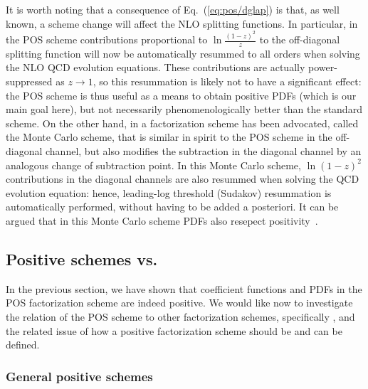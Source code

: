 It is worth noting that a consequence of Eq.~(\ref{eq:pos/dglap}) is that,
as well known, a scheme change will affect the NLO splitting
functions. In particular, in the POS scheme contributions proportional
to $\ln\frac{(1-z)^2}{z}$ to the off-diagonal splitting function will
now be automatically resummed to all orders when solving the NLO QCD
evolution equations. These contributions are actually power-suppressed
as $z\to1$, so this resummation is likely not to have a significant
effect: the POS scheme is thus useful as a means to obtain positive
PDFs (which is our main goal here), but not necessarily
phenomenologically better than the standard \msbar{} scheme. On the
other hand, in \cite{Jadach:2016acv} a factorization scheme has
been advocated, called the Monte Carlo scheme, that is similar in
spirit to the POS scheme in the off-diagonal channel, but also
modifies the \msbar{} subtraction in the diagonal channel by an
analogous change of subtraction point. In this Monte Carlo scheme,
$\ln(1-z)^2$ contributions in the diagonal channels are also resummed
when solving the QCD evolution equation: hence, leading-log threshold (Sudakov)
resummation is automatically performed, without having to be added a
posteriori. It can be argued that in this Monte Carlo scheme PDFs also
resepect positivity~\cite{jadprivate}.



\subsection{Positive schemes vs.\ \msbar{}}
\label{sec:gen}

In the previous section, we have shown that coefficient functions and
PDFs in the POS
factorization scheme are indeed positive. We would like now to
investigate the relation of the POS scheme to other factorization
schemes, specifically \msbar{}, and the related issue 
of
how a positive factorization scheme should be and can be defined.

\subsubsection{General positive schemes}
\label{sec:gensch}


